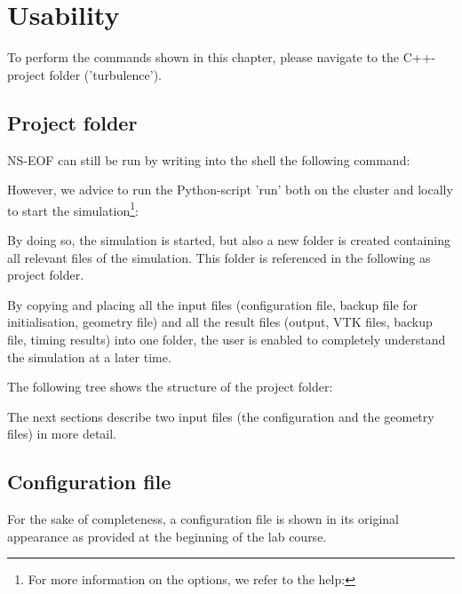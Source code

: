 
\chapter{Usability} %
\label{cha:usability}
To perform the commands shown in this chapter, please navigate to the C++-project folder ('turbulence').


\section{Project folder} %
\label{sec:project_folder}

NS-EOF can still be run by writing into the shell the following command:


\noii However, we advice to run the Python-script 'run' both on the cluster and locally to start the simulation\footnote{For more information on the options, we refer to the help:
}:


\noii By doing so, the simulation is started, but also a new folder is created containing all relevant files of the simulation. This folder is referenced in the following as project folder.

\noii By copying and placing all the input files (configuration file, backup file for initialisation, geometry file) and all the result files (output, VTK files, backup file, timing results) into one folder, the user is enabled to completely understand the simulation at a later time.

\noii The following tree shows the structure of the project folder:

\noii The next sections describe two input files (the configuration and the geometry files) in more detail.

\clearpage

\section{Configuration file} %
\label{sec:configuration_file}

For the sake of completeness, a configuration file is shown in its original appearance as provided at the beginning of the lab course. 

